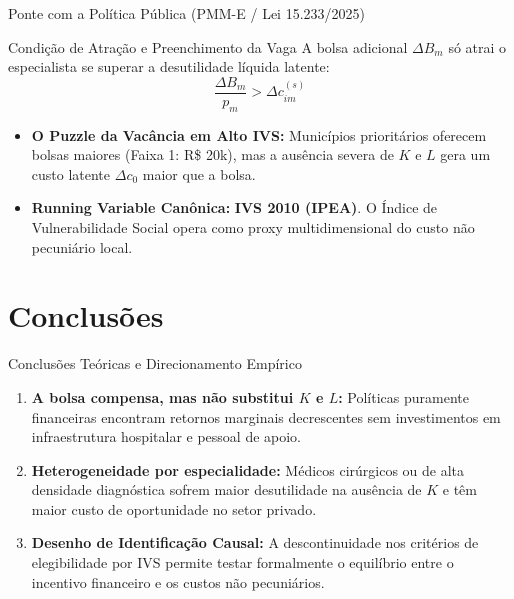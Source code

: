 \documentclass[aspectratio=169, 10pt]{beamer}
\begin{document}
\begin{frame}{Ponte com a Política Pública (PMM-E / Lei 15.233/2025)}
  \begin{block}{Condição de Atração e Preenchimento da Vaga}
    A bolsa adicional $\Delta B_m$ só atrai o especialista se superar a desutilidade líquida latente:
    \begin{equation}
      \frac{\Delta B_m}{p_m} > \Delta c_{im}^{(s)}
    \end{equation}
  \end{block}

  \vspace{0.2cm}
  \begin{itemize}
    \item \textbf{O Puzzle da Vacância em Alto IVS:} Municípios prioritários oferecem bolsas maiores (Faixa 1: R\$ 20k), mas a ausência severa de $K$ e $L$ gera um custo latente $\Delta c_0$ maior que a bolsa.
    \item \textbf{Running Variable Canônica:} \textbf{IVS 2010 (IPEA)}. O Índice de Vulnerabilidade Social opera como proxy multidimensional do custo não pecuniário local.
  \end{itemize}
\end{frame}

\section{Conclusões}

\begin{frame}{Conclusões Teóricas e Direcionamento Empírico}
  \begin{enumerate}
    \item \textbf{A bolsa compensa, mas não substitui $K$ e $L$:} Políticas puramente financeiras encontram retornos marginais decrescentes sem investimentos em infraestrutura hospitalar e pessoal de apoio.
    \item \textbf{Heterogeneidade por especialidade:} Médicos cirúrgicos ou de alta densidade diagnóstica sofrem maior desutilidade na ausência de $K$ e têm maior custo de oportunidade no setor privado.
    \item \textbf{Desenho de Identificação Causal:} A descontinuidade nos critérios de elegibilidade por IVS permite testar formalmente o equilíbrio entre o incentivo financeiro e os custos não pecuniários.
  \end{enumerate}
\end{frame}
\end{document}
